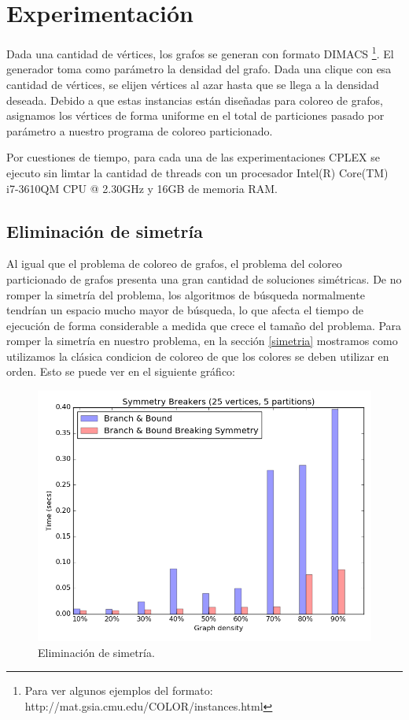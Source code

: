 \section{Experimentación}

Dada una cantidad de vértices, los grafos se generan con formato DIMACS \footnote{Para ver algunos ejemplos del formato: http://mat.gsia.cmu.edu/COLOR/instances.html}. El generador toma como parámetro la densidad del grafo. Dada una clique con esa cantidad de vértices, se elijen vértices al azar hasta que se llega a la densidad deseada. Debido a que estas instancias están diseñadas para coloreo de grafos, asignamos los vértices de forma uniforme en el total de particiones pasado por parámetro a nuestro programa de coloreo particionado.

Por cuestiones de tiempo, para cada una de las experimentaciones CPLEX se ejecuto sin limtar la cantidad de threads con un procesador Intel(R) Core(TM) i7-3610QM CPU @ 2.30GHz y 16GB de memoria RAM.

\subsection{Eliminación de simetría}

Al igual que el problema de coloreo de grafos, el problema del coloreo particionado de grafos presenta una gran cantidad de soluciones simétricas. De no romper la simetría del problema, los algoritmos de búsqueda normalmente tendrían un espacio mucho mayor de búsqueda, lo que afecta el tiempo de ejecución de forma considerable a medida que crece el tamaño del problema. Para romper la simetría en nuestro problema, en la sección \ref{simetria} mostramos como utilizamos la clásica condicion de coloreo de que los colores se deben utilizar en orden. Esto se puede ver en el siguiente gráfico:

\begin{figure}[h]
\centering
\includegraphics[scale=0.7]{img/2-symmetry_v25_p5_l40_t1_b0.png}
\caption{Eliminación de simetría.}
\end{figure}

